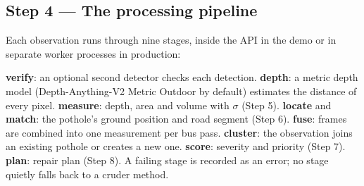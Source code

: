 \documentclass[11pt,a4paper]{article}
\begin{document}
\subsection{Step 4 --- The processing pipeline}
Each observation runs through nine stages, inside the API in the demo or in separate worker processes in
production:
\begin{center}
\end{center}
\textbf{verify}: an optional second detector checks each detection. \textbf{depth}: a metric depth model
(Depth-Anything-V2 Metric Outdoor by default) estimates the distance of every pixel. \textbf{measure}: depth,
area and volume with $\sigma$ (Step 5). \textbf{locate} and \textbf{match}: the pothole's ground position and road
segment (Step 6). \textbf{fuse}: frames are combined into one measurement per bus pass. \textbf{cluster}: the
observation joins an existing pothole or creates a new one. \textbf{score}: severity and priority (Step 7).
\textbf{plan}: repair plan (Step 8). A failing stage is recorded as an error; no stage quietly falls back to a
cruder method.

\end{document}
